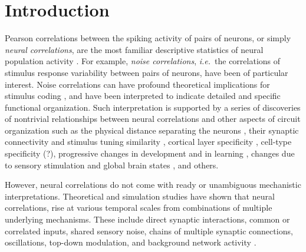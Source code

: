 \documentclass[10pt]{article}
\begin{document}
\section*{Introduction}
Pearson correlations between the spiking activity of pairs of neurons, or simply \emph{neural correlations}, are the most familiar descriptive statistics of neural population activity \cite{Averbeck:2006,Zohary:1994,Kohn:2005,Bair:2001,Renart:2010}.  
For example, \emph{noise correlations}, \emph{i.e.}~the correlations of stimulus response variability between pairs of neurons, have been of particular interest.  
Noise correlations can have profound theoretical implications for stimulus coding \cite{Zohary:1994,Abbott:1999,Averbeck:2006,Berens:2011,Ecker:2011}, and have been interpreted to indicate detailed and specific functional organization. 
Such interpretation is supported by a series of discoveries of nontrivial relationships between neural correlations and other aspects of circuit organization such as the physical distance separating the neurons \cite{Smith:2008,Denman:2013}, their synaptic connectivity and stimulus tuning similarity \cite{Kohn:2005,Ko:2011}, cortical layer specificity \cite{Hansen:2012,Smith:2013}, cell-type specificity (?), progressive changes in development and in learning \cite{Golshani:2009}, changes due to sensory stimulation and global brain states \cite{Goard:2009,Kohn:2009,Ecker:2010,Renart:2010}, and others.

However, neural correlations do not come with ready or unambiguous mechanistic interpretations.
Theoretical and simulation studies have shown that neural correlations, rise at various temporal scales from combinations of multiple underlying mechanisms.
These include direct synaptic interactions, common or correlated inputs, shared sensory noise, chains of multiple synaptic connections, oscillations, top-down modulation, and background network activity \cite{Perkel:1967b,Shadlen:1998,Salinas:2001,Ostojic:2009,Rosenbaum:2011}.
\end{document}
